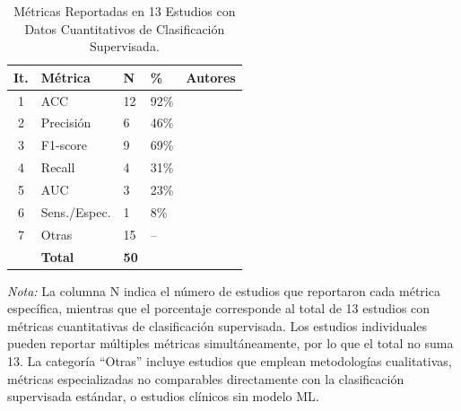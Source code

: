\documentclass[3p,twocolumn,times]{elsarticle}
\begin{document}
	\begin{table}[t]
		\centering
		\caption{Métricas Reportadas en 13 Estudios con Datos Cuantitativos de
			Clasificación Supervisada.}\label{tab8}
		\begin{tabular}{cllll}
			\toprule
			\textbf{It.} & \textbf{Métrica} & \textbf{N} & \textbf{\%} & \textbf{Autores} \\
			\midrule
			1 & ACC          & 12 & 92\% &
			\cite{Johnson2025,Shaik2025,Radocaj2025,Washington2022,Sholikah2024,Sariyanidi2025,Hassan2025,Hwang2024,Aljbori2025,Rhatassi2025,Ramachandran2025,Hosney2024} \\
			2 & Precisión    & 6  & 46\% & \cite{Shaik2025,Hwang2024,Aljbori2025,Ramachandran2025,Hosney2024,Cicceri2026} \\
			3 & F1-score     & 9  & 69\% &
			\cite{Shaik2025,Radocaj2025,Washington2022,Sholikah2024,Hassan2025,Hwang2024,Aljbori2025,Ramachandran2025,Hosney2024} \\
			4 & Recall       & 4  & 31\% & \cite{Shaik2025,Aljbori2025,Ramachandran2025,Hosney2024} \\
			5 & AUC          & 3  & 23\% & \cite{Shaik2025,Aljbori2025,Ramachandran2025} \\
			6 & Sens./Espec. & 1  & 8\%  & \cite{Leo2018} \\
			7 & Otras        & 15 & --   &
			\cite{He2019,Reed2021,Lecciso2021,Ahmad2024,Rhatassi2024,Levy2024,Alsubai2025,Rudovic2018,Rudovic2019,Almeida2019,Alam2025,Nagae2022,Papaioannou2021,Dapogny2019,AkinBulbul2024} \\
			& \textbf{Total} & \textbf{50} & & \\
			\bottomrule
		\end{tabular}
		\begin{minipage}{\textwidth}
			\vspace{6pt}
			\small\textit{Nota:} La columna N indica el número de estudios que reportaron cada
			métrica específica, mientras que el porcentaje corresponde al total de 13 estudios
			con métricas cuantitativas de clasificación supervisada. Los estudios individuales
			pueden reportar múltiples métricas simultáneamente, por lo que el total no suma 13.
			La categoría ``Otras'' incluye estudios que emplean metodologías cualitativas,
			métricas especializadas no comparables directamente con la clasificación supervisada
			estándar, o estudios clínicos sin modelo ML.
		\end{minipage}
	\end{table}
	
\end{document}
